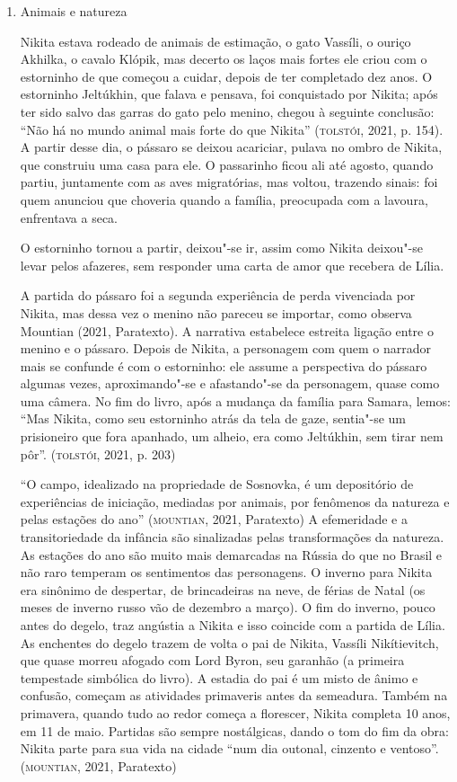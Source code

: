 \documentclass{article}
\begin{document}
\begin{enumerate}
\item
Animais e natureza

Nikita estava rodeado de animais de estimação, o gato Vassíli, o
ouriço Akhilka, o cavalo Klópik, mas decerto os laços mais fortes ele
criou com o estorninho de que começou a cuidar, depois de ter completado
dez anos. O estorninho Jeltúkhin, que falava e pensava, foi conquistado
por Nikita; após ter sido salvo das garras do gato pelo menino, chegou à
seguinte conclusão: ``Não há no mundo animal mais forte do que Nikita''
(\textsc{tolstói}, 2021, p. 154). A partir desse dia, o pássaro se deixou
acariciar, pulava no ombro de Nikita, que construiu uma casa para ele. O
passarinho ficou ali até agosto, quando partiu, juntamente com as aves
migratórias, mas voltou, trazendo sinais: foi quem anunciou que choveria
quando a família, preocupada com a lavoura, enfrentava a seca.

O estorninho tornou a partir, deixou"-se ir, assim como Nikita deixou"-se
levar pelos afazeres, sem responder uma carta de amor que recebera de
Lília.

A partida do pássaro foi a segunda experiência de perda vivenciada por
Nikita, mas dessa vez o menino não pareceu se importar, como observa
Mountian (2021, Paratexto). A narrativa estabelece estreita ligação
entre o menino e o pássaro. Depois de Nikita, a personagem com quem o
narrador mais se confunde é com o estorninho: ele assume a perspectiva
do pássaro algumas vezes, aproximando"-se e afastando"-se da personagem,
quase como uma câmera. No fim do livro, após a mudança da família para
Samara, lemos: ``Mas Nikita, como seu estorninho atrás da tela de gaze,
sentia"-se um prisioneiro que fora apanhado, um alheio, era como
Jeltúkhin, sem tirar nem pôr''. (\textsc{tolstói}, 2021, p. 203)

``O campo, idealizado na propriedade de Sosnovka, é um depositório de
experiências de iniciação, mediadas por animais, por fenômenos da
natureza e pelas estações do ano'' (\textsc{mountian}, 2021, Paratexto) A
efemeridade e a transitoriedade da infância são sinalizadas pelas
transformações da natureza. As estações do ano são muito mais demarcadas
na Rússia do que no Brasil e não raro temperam os sentimentos das
personagens. O inverno para Nikita era sinônimo de despertar, de
brincadeiras na neve, de férias de Natal (os meses de inverno russo vão
de dezembro a março). O fim do inverno, pouco antes do degelo, traz
angústia a Nikita e isso coincide com a partida de Lília. As enchentes
do degelo trazem de volta o pai de Nikita, Vassíli Nikítievitch, que
quase morreu afogado com Lord Byron, seu garanhão (a primeira tempestade
simbólica do livro). A estadia do pai é um misto de ânimo e confusão,
começam as atividades primaveris antes da semeadura. Também na
primavera, quando tudo ao redor começa a florescer, Nikita completa 10
anos, em 11 de maio. Partidas são sempre nostálgicas, dando o tom do fim
da obra: Nikita parte para sua vida na cidade ``num dia outonal,
cinzento e ventoso''. (\textsc{mountian}, 2021, Paratexto)


\end{enumerate}
\end{document}
